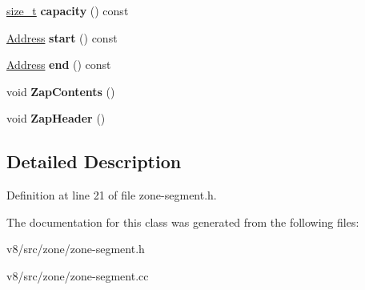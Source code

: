 \begin{DoxyCompactItemize}
\mbox{\hyperlink{classsize__t}{size\+\_\+t}} {\bfseries capacity} () const
\item 
\mbox{\label{classv8_1_1internal_1_1Segment_a2e1f71cda77e5d633b40dab3b9c1a8bf}} 
\mbox{\hyperlink{classuintptr__t}{Address}} {\bfseries start} () const
\item 
\mbox{\label{classv8_1_1internal_1_1Segment_ad25f0125844054e3b76c5f9df9f44e2d}} 
\mbox{\hyperlink{classuintptr__t}{Address}} {\bfseries end} () const
\item 
\mbox{\label{classv8_1_1internal_1_1Segment_afc72b6c0bcc19388e22a4ffb956fa91a}} 
void {\bfseries Zap\+Contents} ()
\item 
\mbox{\label{classv8_1_1internal_1_1Segment_a7e49a7368483ce1176ebfb5c8d2d4f09}} 
void {\bfseries Zap\+Header} ()
\end{DoxyCompactItemize}


\subsection{Detailed Description}


Definition at line 21 of file zone-\/segment.\+h.



The documentation for this class was generated from the following files\+:\begin{DoxyCompactItemize}
\item 
v8/src/zone/zone-\/segment.\+h\item 
v8/src/zone/zone-\/segment.\+cc\end{DoxyCompactItemize}
